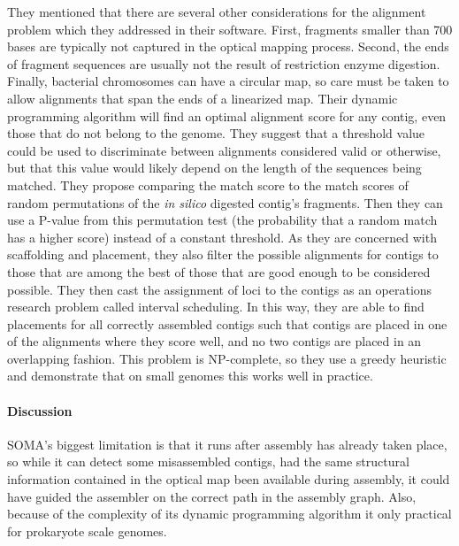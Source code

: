 They mentioned that there are several other considerations for the alignment problem which they addressed in their software.
First, fragments smaller than 700 bases are typically not captured in the optical mapping process.
Second, the ends of fragment sequences are usually not the result of restriction enzyme digestion.
Finally, bacterial chromosomes can have a circular map, so care must be taken to allow alignments that span the ends of a linearized map.
Their dynamic programming algorithm will find an optimal alignment score for any contig, even those that do not belong to the genome.
They suggest that a threshold value could be used to discriminate between alignments considered valid or otherwise, but that this value would likely depend on the length of the sequences being matched.
They propose comparing the match score to the match scores of random permutations of the \emph{in silico} digested contig’s fragments.
Then they can use a P-value from this permutation test (the probability that a random match has a higher score) instead of a constant threshold.
As they are concerned with scaffolding and placement, they also filter the possible alignments for contigs to those that are among the best of those that are good enough to be considered possible.
They then cast the assignment of loci to the contigs as an operations research problem called interval scheduling.
In this way, they are able to find placements for all correctly assembled contigs such that contigs are placed in one of the alignments where they score well, and no two contigs are placed in an overlapping fashion.
This problem is NP-complete, so they use a greedy heuristic and demonstrate that on small genomes this works well in practice.



\paragraph{Discussion}

SOMA's biggest limitation is that it runs after assembly has already taken place, so while it can detect some misassembled contigs, had the same structural information contained in the optical map been available during assembly, it could have guided the assembler on the correct path in the assembly graph.  Also, because of the complexity of its dynamic programming algorithm it only practical for prokaryote scale genomes.

